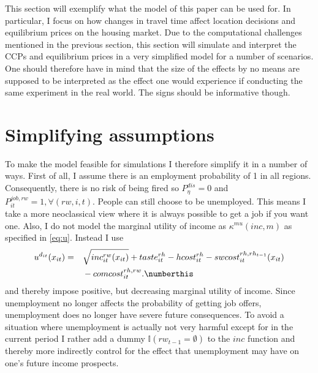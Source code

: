 This section will exemplify what the model of this paper can be used for. In particular, I focus on how changes in travel time affect location decisions and equilibrium prices on the housing market. Due to the computational challenges mentioned in the previous section, this section will simulate and interpret the CCPs and equilibrium prices in a very simplified model for a number of scenarios. One should therefore have in mind that the size of the effects by no means are supposed to be interpreted as the effect one would experience if conducting the same experiment in the real world. The signs should be informative though. 

\section{Simplifying assumptions}
To make the model feasible for simulations I therefore simplify it in a number of ways. First of all, I assume there is an employment probability of 1 in all regions. Consequently, there is no risk of being fired so $P^{dis}_{\eta}=0$ and $P^{job,rw}_{it}=1, \forall (rw,i,t)$. People can still choose to be unemployed. This means I take a more neoclassical view where it is always possible to get a job if you want one. Also, I do not model the marginal utility of income as $\kappa^{mu}(inc,m)$ as specified in \eqref{eq:u}. Instead I use 
\begin{alignat*}{3}
&u^{d_{it}}(x_{it})=&&\sqrt{{inc_{it}^{rw}}(x_{it})}+taste_{it}^{rh}-hcost_{it}^{rh}-swcost_{it}^{rh,rh_{t-1}}(x_{it}) \\
& &&-comcost_{it}^{rh,rw}. \label{eq:u_alt} \numberthis  
\end{alignat*}
and thereby impose positive, but decreasing marginal utility of income. Since unemployment no longer affects the probability of getting job offers, unemployment does no longer have severe future consequences. To avoid a situation where unemployment is actually not very harmful except for in the current period I rather add a dummy $\mathbb{I}{(rw_{t-1}=\emptyset)}$ to the $inc$ function and thereby more indirectly control for the effect that unemployment may have on one's future income prospects. 

